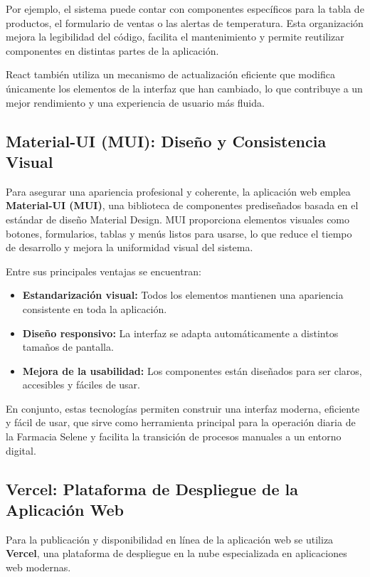 Por ejemplo, el sistema puede contar con componentes específicos para la tabla de productos, el formulario de ventas o las alertas de temperatura. Esta organización mejora la legibilidad del código, facilita el mantenimiento y permite reutilizar componentes en distintas partes de la aplicación.

React también utiliza un mecanismo de actualización eficiente que modifica únicamente los elementos de la interfaz que han cambiado, lo que contribuye a un mejor rendimiento y una experiencia de usuario más fluida.

\subsection{Material-UI (MUI): Diseño y Consistencia Visual}

Para asegurar una apariencia profesional y coherente, la aplicación web emplea \textbf{Material-UI (MUI)}, una biblioteca de componentes prediseñados basada en el estándar de diseño Material Design.
MUI proporciona elementos visuales como botones, formularios, tablas y menús listos para usarse, lo que reduce el tiempo de desarrollo y mejora la uniformidad visual del sistema.

Entre sus principales ventajas se encuentran:

\begin{itemize}
\item \textbf{Estandarización visual:} Todos los elementos mantienen una apariencia consistente en toda la aplicación.
\item \textbf{Diseño responsivo:} La interfaz se adapta automáticamente a distintos tamaños de pantalla.
\item \textbf{Mejora de la usabilidad:} Los componentes están diseñados para ser claros, accesibles y fáciles de usar.
\end{itemize}

En conjunto, estas tecnologías permiten construir una interfaz moderna, eficiente y fácil de usar, que sirve como herramienta principal para la operación diaria de la Farmacia Selene y facilita la transición de procesos manuales a un entorno digital.


\subsection{Vercel: Plataforma de Despliegue de la Aplicación Web}

Para la publicación y disponibilidad en línea de la aplicación web se utiliza \textbf{Vercel}, una plataforma de despliegue en la nube especializada en aplicaciones web modernas.

